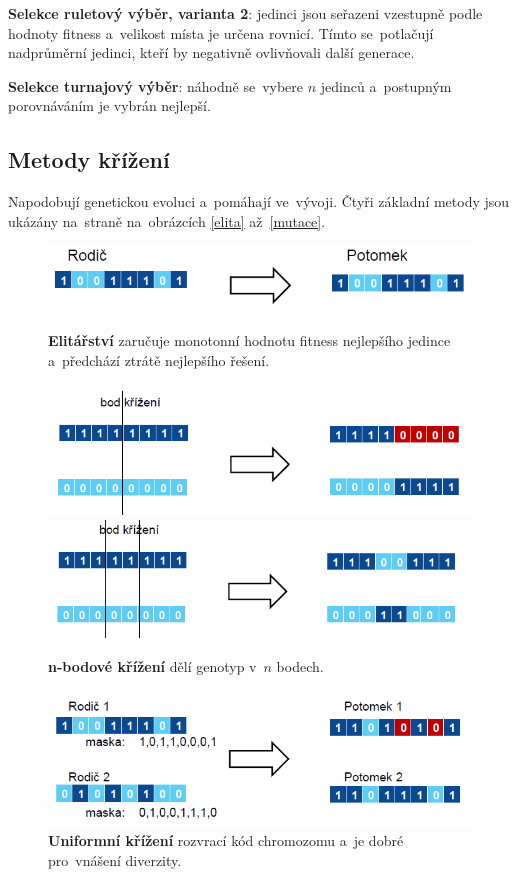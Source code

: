 \textbf{Selekce ruletový výběr, varianta 2}: jedinci jsou seřazeni vzestupně podle hodnoty fitness a~velikost místa je určena rovnicí. Tímto se~potlačují nadprůměrní jedinci, kteří by negativně ovlivňovali další generace.

\textbf{Selekce turnajový výběr}: náhodně se~vybere \( n \) jedinců a~postupným porovnáváním je vybrán nejlepší.

\subsection{Metody křížení}

Napodobují genetickou evoluci a~pomáhají ve~vývoji. Čtyři základní metody jsou ukázány na~straně \pageref{elita} na~obrázcích \ref{elita} až~\ref{mutace}.

\begin{figure}[ht]
	\centering
	\includegraphics[scale=0.7]{images/elita.PNG}
	\caption{\textbf{Elitářství} zaručuje monotonní hodnotu fitness nejlepšího jedince a~předchází ztrátě nejlepšího řešení.}
	\label{elita}

	\includegraphics[scale=0.55]{images/1bod.PNG}
	\includegraphics[scale=0.55]{images/2bod.PNG}
	\caption{\textbf{n-bodové křížení} dělí genotyp v~\( n \) bodech.}
	\label{1bod2bod}

	\includegraphics[scale=0.7]{images/uniform.PNG}
	\caption{\textbf{Uniformní křížení} rozvrací kód chromozomu a~je dobré pro~vnášení diverzity.}
	\label{uniform}


\end{figure}
